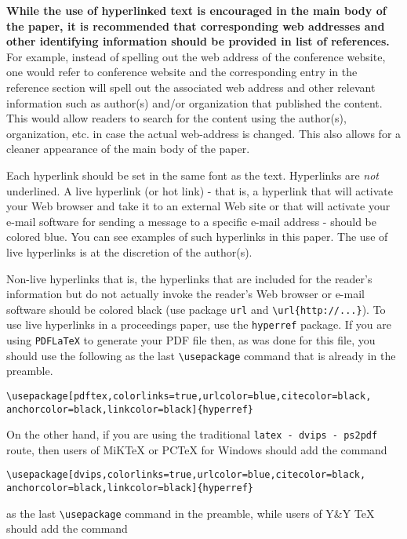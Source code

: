 \documentclass{scspaperproc}
\theoremstyle{scsthe}
\begin{document}
\textbf{While the use of hyperlinked text is encouraged in the main body of the paper, it is recommended that corresponding web addresses and other identifying information should be provided in list of references.} For example, instead of spelling out the web address of the conference website, one would refer to conference website and the corresponding entry in the reference section will spell out the associated web address and other relevant information such as author(s) and/or organization that published the content. This would allow readers to search for the content using the author(s), organization, etc. in case the actual web-address is changed. This also allows for a cleaner appearance of the main body of the paper.

Each hyperlink should be set in the same font as the text. Hyperlinks are \emph{not} underlined. A live hyperlink (or hot link) - that is, a hyperlink that will activate your Web browser and take it to an external Web site or that will activate your e-mail software for sending a message to a specific e-mail address - should be colored blue. You can see examples of such hyperlinks in this paper. The use of live hyperlinks is at the discretion of the author(s).

Non-live hyperlinks that is, the hyperlinks that are included for the reader’s information but do not actually invoke the reader’s Web browser or e-mail software should be colored black (use package \texttt{url} and \verb+\url{http://...}+). To use live hyperlinks in a proceedings paper, use the \texttt{hyperref} package. If you are using \texttt{PDFLaTeX} to generate your PDF file then, as was done for this file, you should use the following as the last \verb+\usepackage+ command that is already in the preamble.

\begin{verbatim}
\usepackage[pdftex,colorlinks=true,urlcolor=blue,citecolor=black,
anchorcolor=black,linkcolor=black]{hyperref}
\end{verbatim}

On the other hand, if you are using the traditional \texttt{latex - dvips - ps2pdf} route, then users of MiKTeX or PCTeX for Windows should add the command

\begin{verbatim}
\usepackage[dvips,colorlinks=true,urlcolor=blue,citecolor=black,
anchorcolor=black,linkcolor=black]{hyperref}
\end{verbatim}

as the last \verb+\usepackage+ command in the preamble, while users of Y\&Y TeX should add the command
\end{document}
